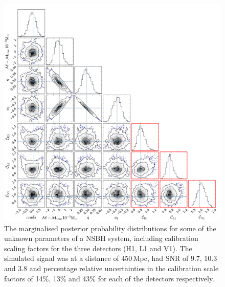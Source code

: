 \documentclass[prd, twocolumn, lengthcheck, superscriptaddress, showpacs, letterpaper, nofootinbib]{revtex4-1}
\begin{document}
\begin{figure}
 \begin{center}
  \includegraphics[width=1.0\textwidth]{nsbh_post_fig.pdf}
 \end{center}
 \caption{\label{fig:nsbhpost} The marginalised posterior probability distributions for some of the unknown
 parameters of a \ac{NSBH} system, including calibration scaling factors for the three detectors 
(H1, L1 and V1). The simulated signal was at a distance of 450\,Mpc, had \ac{SNR} of 9.7, 10.3 and 
3.8 and percentage relative uncertainties in the calibration scale factors of 14\%, 13\% and 43\% 
for each of the detectors respectively.}
\end{figure}
\end{document}
